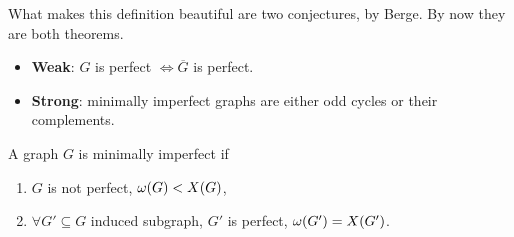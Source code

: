 What makes this definition beautiful are two conjectures, by Berge. By now they are both theorems.
\begin{itemize}
 \item \textbf{Weak}: $G$ is perfect $\Leftrightarrow \overline{G}$ is perfect.
 \item \textbf{Strong}: minimally imperfect graphs are either odd cycles or their complements.
\end{itemize}

\begin{definition}
 A graph $G$ is minimally imperfect if
 \begin{enumerate}
  \item $G$ is not perfect, \ie $\omega(G) < X(G)$,
  \item $\forall G' \subseteq G$ induced subgraph, $G'$ is perfect, \ie $\omega(G') = X(G')$.
 \end{enumerate}

\end{definition}




